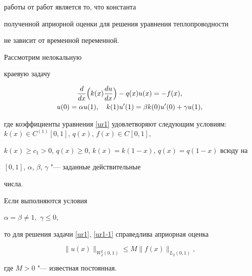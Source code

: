 работы от работ \cite{Al1, Al2} является то, что константа

полученной априорной оценки для решения уравнения теплопроводности

не зависит от временной переменной.







 Рассмотрим нелокальную

краевую задачу

\begin{gather}

\label{ur1}

\frac{d}{dx}\Bigl(k(x)\frac{du}{dx}\Bigr)-q(x)u(x)=-f(x), \\

\label{ur1-1}

u(0)=\alpha u(1), 

\quad k(1)u'(1)=\beta k(0)u'(0)+\gamma u(1),

\end{gather}

где коэффициенты уравнения \eqref{ur1} удовлетворяют следующим условиям: \linebreak $k(x)\in C^{(1)}[0, 1]$, $q(x)$, $f(x)\in C^{}[0, 1]$,

$k(x)\geq c_1>0$, $q(x)\geq0$, $k(x)=k(1-x)$, $q(x)=q(1-x)$ всюду на

$[0, 1]$, $\alpha$, $\beta$, $\gamma$ "--- заданные действительные

числа.



\smallskip



\begin{theorem}[1]Если выполняются условия

$

\alpha=\beta\neq1,$ $\gamma \leq 0,

$

то для решения задачи \eqref{ur1}, \eqref{ur1-1} справедлива априорная оценка

\begin{equation}

\|u(x)\|_{W_{2}^{2}(0, 1)}\leq M\|f(x)\|_{L_2(0, 1)}, 

\label{ur2}

\end{equation}

где  $M>0$ "--- известная постоянная{\rm .}

\end{theorem}



